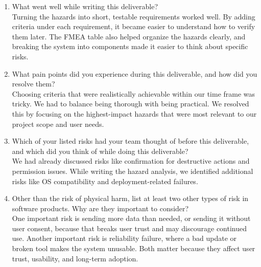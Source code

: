 \documentclass[12pt]{article}
\begin{document}
\begin{enumerate}
  \item What went well while writing this deliverable?\\
  Turning the hazards into short, testable requirements worked well. By
  adding criteria under each requirement, it became easier to understand how
  to verify them later. The FMEA table also helped organize the hazards
  clearly, and breaking the system into components made it easier to think
  about specific risks.

  \item What pain points did you experience during this deliverable, and how
  did you resolve them?\\
  Choosing criteria that were realistically achievable within our time frame
  was tricky. We had to balance being thorough with being practical. We
  resolved this by focusing on the highest-impact hazards that were most
  relevant to our project scope and user needs.

  \item Which of your listed risks had your team thought of before this
  deliverable, and which did you think of while doing this deliverable?\\
  We had already discussed risks like confirmation for destructive actions
  and permission issues. While writing the hazard analysis, we identified
  additional risks like OS compatibility and deployment-related failures.

  \item Other than the risk of physical harm, list at least two other types
  of risk in software products. Why are they important to consider?\\
  One important risk is sending more data than needed, or sending it without
  user consent, because that breaks user trust and may discourage continued
  use. Another important risk is reliability failure, where a bad update or
  broken tool makes the system unusable. Both matter because they affect
  user trust, usability, and long-term adoption.
\end{enumerate}
\end{document}
